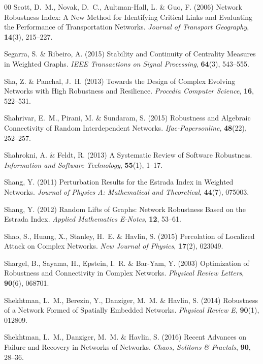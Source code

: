 \documentclass{comnet-mod}
\begin{document}
\begin{thebibliography}{00}
Scott, D.~M., Novak, D.~C., {Aultman-Hall}, L. {\&} Guo, F. (2006)  {Network
  Robustness Index: {{A}} New Method for Identifying Critical Links and
  Evaluating the Performance of Transportation Networks}. {\em {Journal of
  Transport Geography}}, \textbf{14}(3), 215--227.

Segarra, S. {\&} Ribeiro, A. (2015)  {Stability and Continuity of Centrality
  Measures in Weighted Graphs}. {\em {IEEE Transactions on Signal Processing}},
  \textbf{64}(3), 543--555.

Sha, Z. {\&} Panchal, J.~H. (2013)  {Towards the Design of Complex Evolving
  Networks with High Robustness and Resilience}. {\em {Procedia Computer
  Science}}, \textbf{16}, 522--531.

Shahrivar, E.~M., Pirani, M. {\&} Sundaram, S. (2015)  {Robustness and
  Algebraic Connectivity of Random Interdependent Networks}. {\em
  {Ifac-Papersonline}}, \textbf{48}(22), 252--257.

Shahrokni, A. {\&} Feldt, R. (2013)  {A Systematic Review of Software
  Robustness}. {\em {Information and Software Technology}}, \textbf{55}(1),
  1--17.

Shang, Y. (2011)  {Perturbation Results for the {{Estrada}} Index in Weighted
  Networks}. {\em {Journal of Physics A: Mathematical and Theoretical}},
  \textbf{44}(7), 075003.

Shang, Y. (2012)  {Random Lifts of Graphs: {{Network}} Robustness Based on the
  {{Estrada}} Index}. {\em {Applied Mathematics E-Notes}}, \textbf{12}, 53--61.

Shao, S., Huang, X., Stanley, H.~E. {\&} Havlin, S. (2015)  {Percolation of
  Localized Attack on Complex Networks}. {\em {New Journal of Physics}},
  \textbf{17}(2), 023049.

Shargel, B., Sayama, H., Epstein, I.~R. {\&} {Bar-Yam}, Y. (2003)
  {Optimization of Robustness and Connectivity in Complex Networks}. {\em
  {Physical Review Letters}}, \textbf{90}(6), 068701.

Shekhtman, L.~M., Berezin, Y., Danziger, M.~M. {\&} Havlin, S. (2014)
  {Robustness of a Network Formed of Spatially Embedded Networks}. {\em
  {Physical Review E}}, \textbf{90}(1), 012809.

Shekhtman, L.~M., Danziger, M.~M. {\&} Havlin, S. (2016)  {Recent Advances on
  Failure and Recovery in Networks of Networks}. {\em {Chaos, Solitons \&
  Fractals}}, \textbf{90}, 28--36.


\end{thebibliography}
\end{document}
